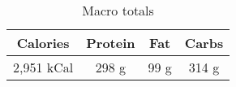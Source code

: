 \documentclass{report}
\begin{document}
\begin{multicols}{2}
\begin{enumerate}
 
\end{enumerate}
\begin{table}[H]
  \begin{center}
    \caption{Macro totals}
    \label{tab:table1}
    \begin{tabular}{c|c|c|c} %
      \textbf{Calories} & \textbf{Protein} & \textbf{Fat} & \textbf{Carbs}\\
      \hline
      2,951 kCal & 298 g & 99 g & 314 g\\
    \end{tabular}
  \end{center}
\end{table}
\end{multicols}



\end{document}
